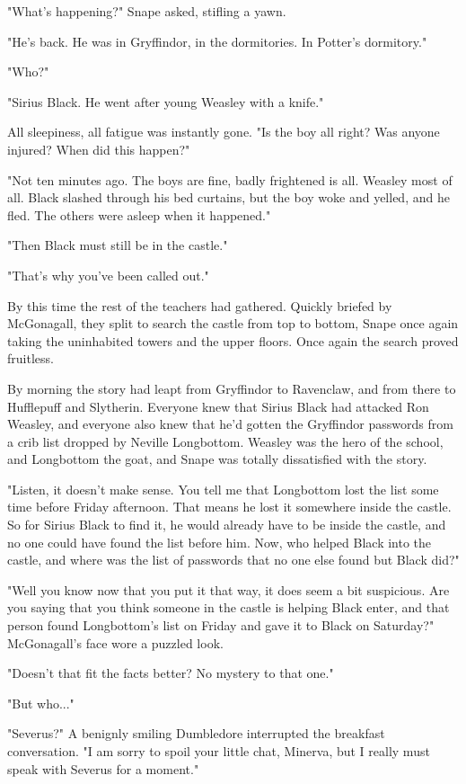 "What's happening?" Snape asked, stifling a yawn.

"He's back. He was in Gryffindor, in the dormitories. In Potter's dormitory."

"Who?"

"Sirius Black. He went after young Weasley with a knife."

All sleepiness, all fatigue was instantly gone. "Is the boy all right? Was anyone injured? When did this happen?"

"Not ten minutes ago. The boys are fine, badly frightened is all. Weasley most of all. Black slashed through his bed curtains, but the boy woke and yelled, and he fled. The others were asleep when it happened."

"Then Black must still be in the castle."

"That's why you've been called out."

By this time the rest of the teachers had gathered. Quickly briefed by McGonagall, they split to search the castle from top to bottom, Snape once again taking the uninhabited towers and the upper floors. Once again the search proved fruitless.

By morning the story had leapt from Gryffindor to Ravenclaw, and from there to Hufflepuff and Slytherin. Everyone knew that Sirius Black had attacked Ron Weasley, and everyone also knew that he'd gotten the Gryffindor passwords from a crib list dropped by Neville Longbottom. Weasley was the hero of the school, and Longbottom the goat, and Snape was totally dissatisfied with the story.

"Listen, it doesn't make sense. You tell me that Longbottom lost the list some time before Friday afternoon. That means he lost it somewhere inside the castle. So for Sirius Black to find it, he would already have to be inside the castle, and no one could have found the list before him. Now, who helped Black into the castle, and where was the list of passwords that no one else found but Black did?"

"Well you know now that you put it that way, it does seem a bit suspicious. Are you saying that you think someone in the castle is helping Black enter, and that person found Longbottom's list on Friday and gave it to Black on Saturday?" McGonagall's face wore a puzzled look.

"Doesn't that fit the facts better? No mystery to that one."

"But who..."

"Severus?" A benignly smiling Dumbledore interrupted the breakfast conversation. "I am sorry to spoil your little chat, Minerva, but I really must speak with Severus for a moment."

